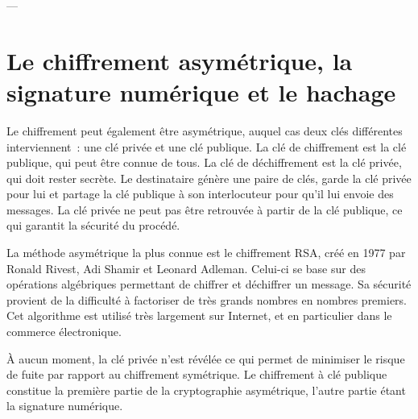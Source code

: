---

%
%





\section{Le chiffrement asymétrique, la signature numérique et le hachage}


Le chiffrement peut également être asymétrique, auquel cas deux clés différentes interviennent~: une clé privée et une clé publique. La clé de chiffrement est la clé publique, qui peut être connue de tous. La clé de déchiffrement est la clé privée, qui doit rester secrète. Le destinataire génère une paire de clés, garde la clé privée pour lui et partage la clé publique à son interlocuteur pour qu'il lui envoie des messages. La clé privée ne peut pas être retrouvée à partir de la clé publique, ce qui garantit la sécurité du procédé.

La méthode asymétrique la plus connue est le chiffrement RSA, créé en 1977 par Ronald Rivest, Adi Shamir et Leonard Adleman. Celui-ci se base sur des opérations algébriques permettant de chiffrer et déchiffrer un message. Sa sécurité provient de la difficulté à factoriser de très grands nombres en nombres premiers. Cet algorithme est utilisé très largement sur Internet, et en particulier dans le commerce électronique.

À aucun moment, la clé privée n'est révélée ce qui permet de minimiser le risque de fuite par rapport au chiffrement symétrique. Le chiffrement à clé publique constitue la première partie de la cryptographie asymétrique, l'autre partie étant la signature numérique.

